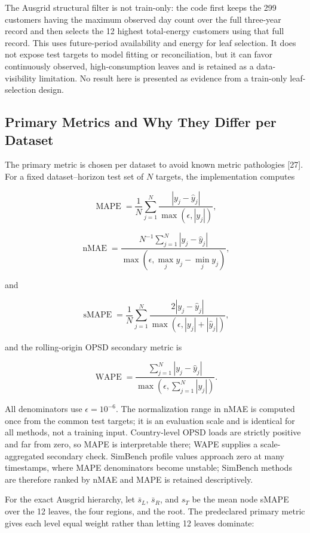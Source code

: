 \documentclass[electronics,article,submit,moreauthors]{Definitions/mdpi}
\begin{document}
The Ausgrid structural filter is not train-only: the code first keeps the 299 customers having the maximum observed day count over the full three-year record and then selects the 12 highest total-energy customers using that full record. This uses future-period availability and energy for leaf selection. It does not expose test targets to model fitting or reconciliation, but it can favor continuously observed, high-consumption leaves and is retained as a data-visibility limitation. No result here is presented as evidence from a train-only leaf-selection design.

\subsection{Primary Metrics and Why They Differ per Dataset}\label{primary-metrics-and-why-they-differ-per-dataset}

The primary metric is chosen per dataset to avoid known metric pathologies {[}27{]}. For a fixed dataset--horizon test set of \(N\) targets, the implementation computes

\[
\operatorname{MAPE}=\frac{1}{N}\sum_{j=1}^{N}\frac{|y_j-\hat y_j|}{\max(\epsilon,|y_j|)},
\]

\[
\operatorname{nMAE}=\frac{N^{-1}\sum_{j=1}^{N}|y_j-\hat y_j|}
{\max\!\left(\epsilon,\max_j y_j-\min_j y_j\right)},
\]

and

\[
\operatorname{sMAPE}=\frac{1}{N}\sum_{j=1}^{N}
\frac{2|y_j-\hat y_j|}{\max(\epsilon,|y_j|+|\hat y_j|)},
\]

and the rolling-origin OPSD secondary metric is

\[
\operatorname{WAPE}=\frac{\sum_{j=1}^{N}|y_j-\hat y_j|}{\max(\epsilon,\sum_{j=1}^{N}|y_j|)}.
\]

All denominators use \(\epsilon=10^{-6}\). The normalization range in nMAE is computed once from the common test targets; it is an evaluation scale and is identical for all methods, not a training input. Country-level OPSD loads are strictly positive and far from zero, so MAPE is interpretable there; WAPE supplies a scale-aggregated secondary check. SimBench profile values approach zero at many timestamps, where MAPE denominators become unstable; SimBench methods are therefore ranked by nMAE and MAPE is retained descriptively.

For the exact Ausgrid hierarchy, let \(\bar s_L\), \(\bar s_R\), and \(s_T\) be the mean node sMAPE over the 12 leaves, the four regions, and the root. The predeclared primary metric gives each level equal weight rather than letting 12 leaves dominate:
\end{document}
